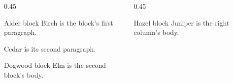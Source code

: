 \documentclass{beamer}
\begin{document}
\begin{frame}[t]
\begin{columns}[T]
\begin{column}{0.45\textwidth}
\begin{block}{Alder block}
Birch is the block's first paragraph.

Cedar is its second paragraph.
\end{block}
\begin{block}{Dogwood block}
Elm is the second block's body.
\end{block}
\end{column}
\begin{column}{0.45\textwidth}
\begin{block}{Hazel block}
Juniper is the right column's body.
\end{block}
\end{column}
\end{columns}
\end{frame}
\end{document}
